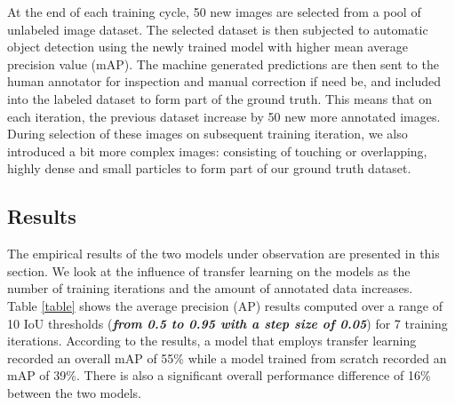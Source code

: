 \documentclass[conference]{IEEEtran}
\begin{document}
		At the end of each training cycle, 50 new images are selected from a pool of unlabeled
image dataset. The selected dataset is then subjected to automatic object detection using
the newly trained model with higher mean average precision value (mAP). The machine
generated predictions are then sent to the human annotator for inspection and manual
correction if need be, and included into the labeled dataset to form part of the ground	truth. This means that on each iteration, the previous dataset increase by 50 new more
annotated images. During selection of these images on subsequent training iteration, we
also introduced a bit more complex images: consisting of touching or overlapping, highly
dense and small particles to form part of our ground truth dataset.\\
		
	\subsection{Results}
	
		The empirical results of the two models under observation are presented in this section. We
look at the influence of transfer learning on the models as the number of training iterations
and the amount of annotated data increases.\\
		
		Table \ref{table} shows the average precision (AP) results computed over a range of 10 IoU thresholds (\textbf{\textit{from 0.5 to 0.95 with a step size of 0.05}}) for 7 training iterations. According to the results, a model that employs transfer learning recorded an
overall mAP of 55\% while a model trained from scratch recorded an mAP of 39\%. There is also a significant
overall performance difference of 16\% between the two models.
		
\end{document}
